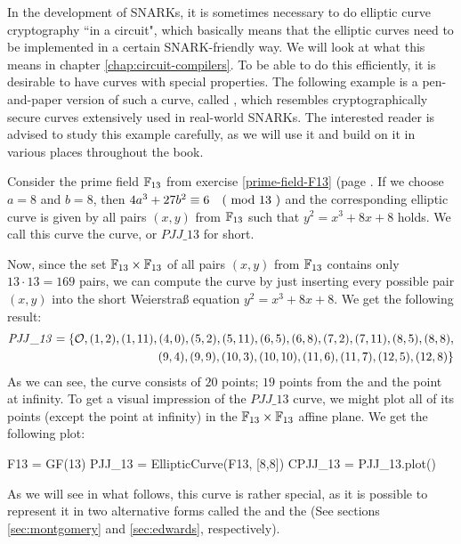 In the development of SNARKs, it is sometimes necessary to do elliptic curve cryptography ``in a circuit", which basically means that the elliptic curves need to be implemented in a certain SNARK-friendly way. We will look at what this means in chapter \ref{chap:circuit-compilers}. To be able to do this efficiently, it is desirable to have curves with special properties. The following example is a pen-and-paper version of such a curve, called , which resembles cryptographically secure curves extensively used in real-world SNARKs. The interested reader is advised to study this example carefully, as we will use it and build on it in various places throughout the book. 
\begin{example}\label{PJJ13} Consider the prime field $\mathbb{F}_{13}$ from exercise \ref{prime-field-F13} (page \pageref{prime-field-F13}. If we choose $a=8$ and $b=8$, then $4a^3+ 27b^2 \equiv 6 \quad \text{( mod } 13 \text{ )}$ and the corresponding elliptic curve is given by all pairs $(x,y)$ from $\mathbb{F}_{13}$ such that $y^2=x^3+8x+8$ holds. We call this curve the  curve, or  $\mathit{PJJ\_13}$ for short.

Now, since the set $\mathbb{F}_{13}\times \mathbb{F}_{13}$ of all pairs $(x,y)$ from $\mathbb{F}_{13}$ contains only $13\cdot 13=169$ pairs, we can compute the curve by just inserting every possible pair $(x,y)$ into the short Weierstraß equation $y^2 = x^3 +8x +8$.  We get the following result:
\begin{equation}\label{eq:PJJ13-weierstrass}
\begin{split}
\mathit{PJJ\_13} = \{\mathcal{O}, (1, 2), (1, 11), (4, 0), (5, 2), (5, 11), (6, 5), (6, 8), (7,2), (7, 11), (8, 5), (8, 8),\\ (9, 4), (9, 9), (10, 3), (10,
10), (11, 6), (11, 7), (12, 5), (12, 8)\}
\end{split}
\end{equation}
As we can see, the curve consists of $20$ points; $19$ points from the  and the point at infinity.
To get a visual impression of the $\mathit{PJJ\_13}$ curve, we might plot all of its points (except the point at infinity) in the $\mathbb{F}_{13}\times \mathbb{F}_{13}$ affine plane. We get the following plot: 
\begin{sagesilent}
F13 = GF(13)
PJJ_13 = EllipticCurve(F13, [8,8])
CPJJ_13 = PJJ_13.plot()
\end{sagesilent}
\begin{center} 
\end{center}
As we will see in what follows, this curve is rather special, as it is possible to represent it in two alternative forms called the  and the  (See sections \ref{sec:montgomery} and \ref{sec:edwards}, respectively).
\end{example}
